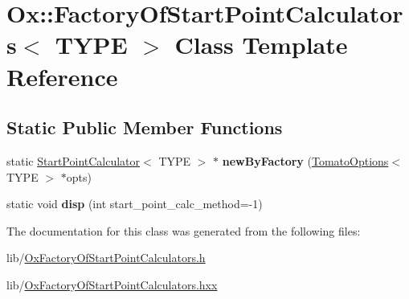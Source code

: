 \hypertarget{class_ox_1_1_factory_of_start_point_calculators}{}\section{Ox\+:\+:Factory\+Of\+Start\+Point\+Calculators$<$ T\+Y\+PE $>$ Class Template Reference}
\label{class_ox_1_1_factory_of_start_point_calculators}
\subsection*{Static Public Member Functions}
\begin{DoxyCompactItemize}
\item 
static \hyperlink{class_ox_1_1_start_point_calculator}{Start\+Point\+Calculator}$<$ T\+Y\+PE $>$ $\ast$ {\bfseries new\+By\+Factory} (\hyperlink{class_ox_1_1_tomato_options}{Tomato\+Options}$<$ T\+Y\+PE $>$ $\ast$opts)\hypertarget{class_ox_1_1_factory_of_start_point_calculators_ad8d353d479c4e0592957c9fae97f2ce3}{}\label{class_ox_1_1_factory_of_start_point_calculators_ad8d353d479c4e0592957c9fae97f2ce3}

\item 
static void {\bfseries disp} (int start\+\_\+point\+\_\+calc\+\_\+method=-\/1)\hypertarget{class_ox_1_1_factory_of_start_point_calculators_ab68ca3710bef131e972cc99b7f4e3797}{}\label{class_ox_1_1_factory_of_start_point_calculators_ab68ca3710bef131e972cc99b7f4e3797}

\end{DoxyCompactItemize}


The documentation for this class was generated from the following files\+:\begin{DoxyCompactItemize}
\item 
lib/\hyperlink{_ox_factory_of_start_point_calculators_8h}{Ox\+Factory\+Of\+Start\+Point\+Calculators.\+h}\item 
lib/\hyperlink{_ox_factory_of_start_point_calculators_8hxx}{Ox\+Factory\+Of\+Start\+Point\+Calculators.\+hxx}\end{DoxyCompactItemize}
